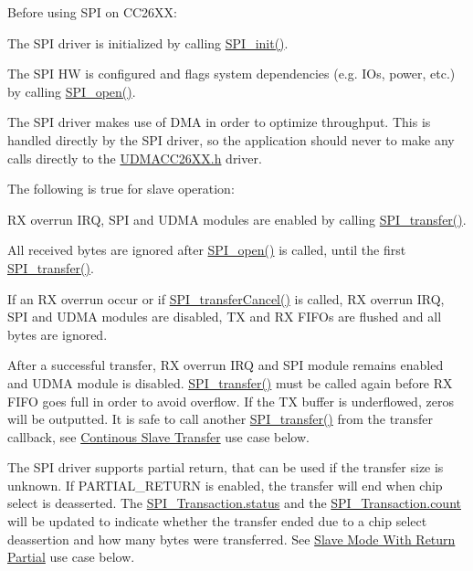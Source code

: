 Before using S\-P\-I on C\-C26\-X\-X\-:
\begin{DoxyItemize}
\item The S\-P\-I driver is initialized by calling \hyperlink{_s_p_i_8h_afd9b09f58917f0e2d14c61b956eba214}{S\-P\-I\-\_\-init()}.
\item The S\-P\-I H\-W is configured and flags system dependencies (e.\-g. I\-Os, power, etc.) by calling \hyperlink{_s_p_i_8h_a62cfe494cb1df47cd602e8747e894fd1}{S\-P\-I\-\_\-open()}.
\item The S\-P\-I driver makes use of D\-M\-A in order to optimize throughput. This is handled directly by the S\-P\-I driver, so the application should never to make any calls directly to the \hyperlink{_u_d_m_a_c_c26_x_x_8h}{U\-D\-M\-A\-C\-C26\-X\-X.\-h} driver.
\end{DoxyItemize}

The following is true for slave operation\-:
\begin{DoxyItemize}
\item R\-X overrun I\-R\-Q, S\-P\-I and U\-D\-M\-A modules are enabled by calling \hyperlink{_s_p_i_8h_a989e17f96b54fcc3dc2cac5f8ac6bdb2}{S\-P\-I\-\_\-transfer()}.
\item All received bytes are ignored after \hyperlink{_s_p_i_8h_a62cfe494cb1df47cd602e8747e894fd1}{S\-P\-I\-\_\-open()} is called, until the first \hyperlink{_s_p_i_8h_a989e17f96b54fcc3dc2cac5f8ac6bdb2}{S\-P\-I\-\_\-transfer()}.
\item If an R\-X overrun occur or if \hyperlink{_s_p_i_8h_a6819f7761fc3505c4f885653ff8121f0}{S\-P\-I\-\_\-transfer\-Cancel()} is called, R\-X overrun I\-R\-Q, S\-P\-I and U\-D\-M\-A modules are disabled, T\-X and R\-X F\-I\-F\-Os are flushed and all bytes are ignored.
\item After a successful transfer, R\-X overrun I\-R\-Q and S\-P\-I module remains enabled and U\-D\-M\-A module is disabled. \hyperlink{_s_p_i_8h_a989e17f96b54fcc3dc2cac5f8ac6bdb2}{S\-P\-I\-\_\-transfer()} must be called again before R\-X F\-I\-F\-O goes full in order to avoid overflow. If the T\-X buffer is underflowed, zeros will be outputted. It is safe to call another \hyperlink{_s_p_i_8h_a989e17f96b54fcc3dc2cac5f8ac6bdb2}{S\-P\-I\-\_\-transfer()} from the transfer callback, see \hyperlink{_s_p_i_c_c26_x_x_d_m_a_8h_USE_CASE_CST}{Continous Slave Transfer} use case below.
\item The S\-P\-I driver supports partial return, that can be used if the transfer size is unknown. If P\-A\-R\-T\-I\-A\-L\-\_\-\-R\-E\-T\-U\-R\-N is enabled, the transfer will end when chip select is deasserted. The \hyperlink{struct_s_p_i___transaction_aa244504b2384411f7de17340be62128a}{S\-P\-I\-\_\-\-Transaction.\-status} and the \hyperlink{struct_s_p_i___transaction_ad049d6a900c4bdb59a5ee8ce3d5bced2}{S\-P\-I\-\_\-\-Transaction.\-count} will be updated to indicate whether the transfer ended due to a chip select deassertion and how many bytes were transferred. See \hyperlink{_s_p_i_c_c26_x_x_d_m_a_8h_USE_CASE_RP}{Slave Mode With Return Partial} use case below.
\end{DoxyItemize}

